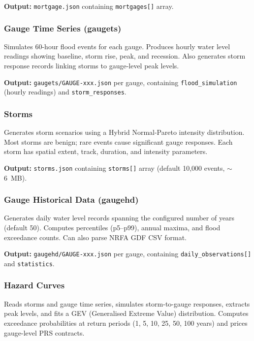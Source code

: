 \documentclass[11pt,a4paper]{article}
\begin{document}
\textbf{Output:} \texttt{mortgage.json} containing \texttt{mortgages[]} array.

\subsubsection{Gauge Time Series (gaugets)}

Simulates 60-hour flood events for each gauge. Produces hourly water level
readings showing baseline, storm rise, peak, and recession. Also generates
storm response records linking storms to gauge-level peak levels.

\textbf{Output:} \texttt{gaugets/GAUGE-xxx.json} per gauge, containing
\texttt{flood\_simulation} (hourly readings) and \texttt{storm\_responses}.

\subsubsection{Storms}

Generates storm scenarios using a Hybrid Normal-Pareto intensity distribution.
Most storms are benign; rare events cause significant gauge responses. Each
storm has spatial extent, track, duration, and intensity parameters.

\textbf{Output:} \texttt{storms.json} containing \texttt{storms[]} array
(default 10,000 events, $\sim$6~MB).

\subsubsection{Gauge Historical Data (gaugehd)}

Generates daily water level records spanning the configured number of years
(default 50). Computes percentiles (p5--p99), annual maxima, and flood
exceedance counts. Can also parse NRFA GDF CSV format.

\textbf{Output:} \texttt{gaugehd/GAUGE-xxx.json} per gauge, containing
\texttt{daily\_observations[]} and \texttt{statistics}.

\subsubsection{Hazard Curves}

Reads storms and gauge time series, simulates storm-to-gauge responses,
extracts peak levels, and fits a GEV (Generalised Extreme Value) distribution.
Computes exceedance probabilities at return periods (1, 5, 10, 25, 50, 100
years) and prices gauge-level PRS contracts.
\end{document}
